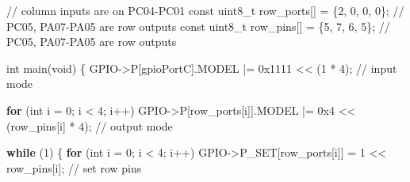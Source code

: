 \documentclass[
  9pt,
  letterpaper,
  abstract,
  titlepage]{scrbook}
\newenvironment{Shaded}{\begin{snugshade}}{\end{snugshade}}
\newcommand{\BaseNTok}[1]{\textcolor[rgb]{0.68,0.00,0.00}{#1}}
\newcommand{\CommentTok}[1]{\textcolor[rgb]{0.37,0.37,0.37}{#1}}
\newcommand{\ControlFlowTok}[1]{\textcolor[rgb]{0.00,0.23,0.31}{\textbf{#1}}}
\newcommand{\DataTypeTok}[1]{\textcolor[rgb]{0.68,0.00,0.00}{#1}}
\newcommand{\DecValTok}[1]{\textcolor[rgb]{0.68,0.00,0.00}{#1}}
\newcommand{\NormalTok}[1]{\textcolor[rgb]{0.00,0.23,0.31}{#1}}
\newcommand{\OperatorTok}[1]{\textcolor[rgb]{0.37,0.37,0.37}{#1}}
\begin{document}
\begin{Shaded}
\begin{Highlighting}[]
\CommentTok{// column inputs are on PC04{-}PC01}
\DataTypeTok{const} \DataTypeTok{uint8\_t}\NormalTok{ row\_ports}\OperatorTok{[]} \OperatorTok{=} \OperatorTok{\{}\DecValTok{2}\OperatorTok{,} \DecValTok{0}\OperatorTok{,} \DecValTok{0}\OperatorTok{,} \DecValTok{0}\OperatorTok{\};} \CommentTok{// PC05, PA07{-}PA05 are row outputs}
\DataTypeTok{const} \DataTypeTok{uint8\_t}\NormalTok{ row\_pins}\OperatorTok{[]} \OperatorTok{=} \OperatorTok{\{}\DecValTok{5}\OperatorTok{,} \DecValTok{7}\OperatorTok{,} \DecValTok{6}\OperatorTok{,} \DecValTok{5}\OperatorTok{\};}  \CommentTok{// PC05, PA07{-}PA05 are row outputs}

\DataTypeTok{int}\NormalTok{ main}\OperatorTok{(}\DataTypeTok{void}\OperatorTok{)}
\OperatorTok{\{}
\NormalTok{    GPIO}\OperatorTok{{-}\textgreater{}}\NormalTok{P}\OperatorTok{[}\NormalTok{gpioPortC}\OperatorTok{].}\NormalTok{MODEL }\OperatorTok{|=} \BaseNTok{0x1111} \OperatorTok{\textless{}\textless{}} \OperatorTok{(}\DecValTok{1} \OperatorTok{*} \DecValTok{4}\OperatorTok{);} \CommentTok{// input mode}

    \ControlFlowTok{for} \OperatorTok{(}\DataTypeTok{int}\NormalTok{ i }\OperatorTok{=} \DecValTok{0}\OperatorTok{;}\NormalTok{ i }\OperatorTok{\textless{}} \DecValTok{4}\OperatorTok{;}\NormalTok{ i}\OperatorTok{++)}
\NormalTok{        GPIO}\OperatorTok{{-}\textgreater{}}\NormalTok{P}\OperatorTok{[}\NormalTok{row\_ports}\OperatorTok{[}\NormalTok{i}\OperatorTok{]].}\NormalTok{MODEL }\OperatorTok{|=} \BaseNTok{0x4} \OperatorTok{\textless{}\textless{}} \OperatorTok{(}\NormalTok{row\_pins}\OperatorTok{[}\NormalTok{i}\OperatorTok{]} \OperatorTok{*} \DecValTok{4}\OperatorTok{);} \CommentTok{// output mode}

    \ControlFlowTok{while} \OperatorTok{(}\DecValTok{1}\OperatorTok{)}
    \OperatorTok{\{}
        \ControlFlowTok{for} \OperatorTok{(}\DataTypeTok{int}\NormalTok{ i }\OperatorTok{=} \DecValTok{0}\OperatorTok{;}\NormalTok{ i }\OperatorTok{\textless{}} \DecValTok{4}\OperatorTok{;}\NormalTok{ i}\OperatorTok{++)}
\NormalTok{            GPIO}\OperatorTok{{-}\textgreater{}}\NormalTok{P\_SET}\OperatorTok{[}\NormalTok{row\_ports}\OperatorTok{[}\NormalTok{i}\OperatorTok{]]} \OperatorTok{=} \DecValTok{1} \OperatorTok{\textless{}\textless{}}\NormalTok{ row\_pins}\OperatorTok{[}\NormalTok{i}\OperatorTok{];} \CommentTok{// set row pins}


\end{Highlighting}
\end{Shaded}
\end{document}
